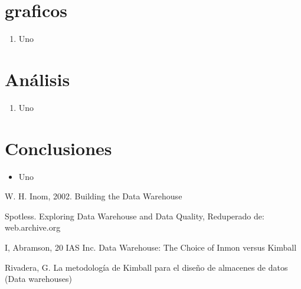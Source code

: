 \documentclass[twoside,twocolumn]{article}
\begin{document}
\section{graficos}
\begin{enumerate}

 \item Uno
   
\end{enumerate}


\section{Análisis}

\begin{enumerate}

    \item Uno
\end{enumerate}


\section{Conclusiones}
\begin{itemize}	
 \item Uno

\end{itemize} 





\begin{thebibliography}{99} 

\bibitem[1]{}
\newblock W. H. Inom, 2002. Building the Data Warehouse

\bibitem[2]{}
\newblock Spotless. Exploring Data Warehouse and Data Quality, Reduperado de: web.archive.org

\bibitem[3]{}
\newblock I, Abramson, 20 IAS Inc. Data Warehouse: The Choice of Inmon versus Kimball

\bibitem[4]{}
\newblock Rivadera, G. La metodología de Kimball para el diseño de almacenes de
datos (Data warehouses) 

\end{thebibliography}


\end{document}
